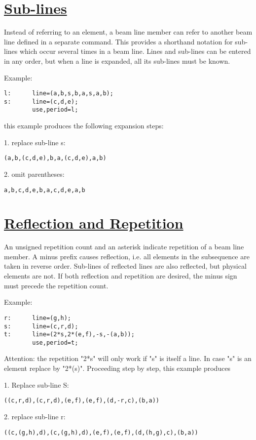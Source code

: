 \section{\href{subline}{Sub-lines}} 
Instead of referring to an element, a beam line member can refer to
another beam line defined in a separate command. This provides a
shorthand notation for sub-lines which occur several times in a beam
line. Lines and sub-lines can be entered in any order, but when a line
is expanded, all its sub-lines must be known.  

Example: 
\begin{verbatim}
l:      line=(a,b,s,b,a,s,a,b);
s:      line=(c,d,e);
        use,period=l;
\end{verbatim} 
this example produces the following expansion steps: 

1. replace sub-line s: 
\begin{verbatim}
(a,b,(c,d,e),b,a,(c,d,e),a,b)
\end{verbatim}

2. omit parentheses: 
\begin{verbatim}
a,b,c,d,e,b,a,c,d,e,a,b
\end{verbatim}

\section{\href{reflect}{Reflection and Repetition}} 
An unsigned repetition count and an asterisk indicate repetition of a
beam line member. A minus prefix causes reflection, i.e. all elements in
the subsequence are taken in reverse order. Sub-lines of reflected lines
are also reflected, but physical elements are not. If both reflection
and repetition are desired, the minus sign must precede the repetition
count.  

Example: 
\begin{verbatim}
r:      line=(g,h);
s:      line=(c,r,d);
t:      line=(2*s,2*(e,f),-s,-(a,b));
        use,period=t;
\end{verbatim}
Attention: the repetition "2*s" will only work if
"s" is itself a line. In case "s" is an element replace by
"2*(s)".  Proceeding step by step, this example produces 

1. Replace sub-line S: 
\begin{verbatim}
((c,r,d),(c,r,d),(e,f),(e,f),(d,-r,c),(b,a))
\end{verbatim}

2. replace sub-line r: 
\begin{verbatim}
((c,(g,h),d),(c,(g,h),d),(e,f),(e,f),(d,(h,g),c),(b,a))
\end{verbatim}

